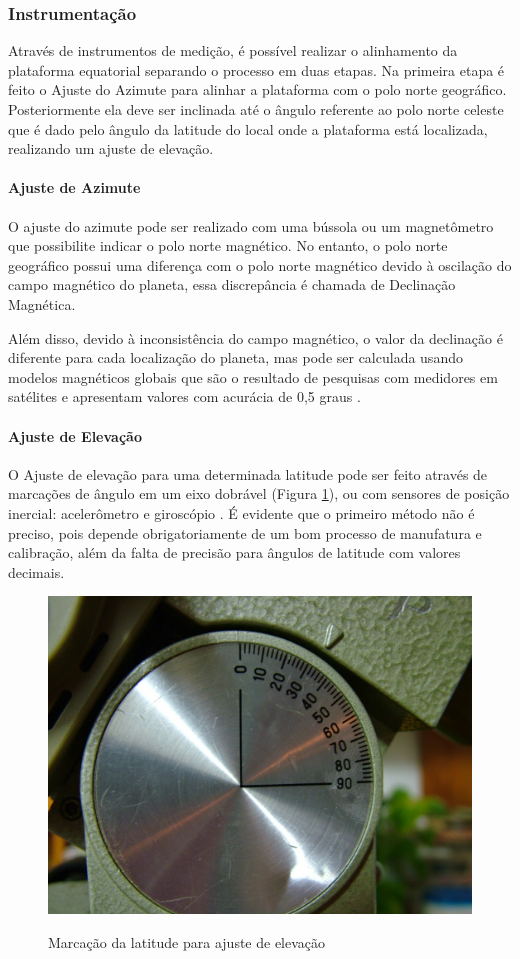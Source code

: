\subsubsection{Instrumentação}

Através de instrumentos de medição, é possível realizar o alinhamento da plataforma equatorial separando o processo em duas etapas. Na primeira etapa é feito o Ajuste do Azimute para alinhar a plataforma com o polo norte geográfico. Posteriormente ela deve ser inclinada até o ângulo referente ao polo norte celeste que é dado pelo ângulo da latitude do local onde a plataforma está localizada, realizando um ajuste de elevação. 

\paragraph{Ajuste de Azimute}
O ajuste do azimute pode ser realizado com uma bússola ou um magnetômetro que possibilite indicar o polo norte magnético. No entanto, o polo norte geográfico possui uma diferença com o polo norte magnético devido à oscilação do campo magnético do planeta, essa discrepância é chamada de Declinação Magnética. 

Além disso, devido à inconsistência do campo magnético, o valor da declinação é diferente para cada localização do planeta, mas pode ser calculada usando modelos magnéticos globais que são o resultado de pesquisas com medidores em satélites e apresentam valores com acurácia de 0,5 graus \cite{site:noicDecMag}.

\paragraph{Ajuste de Elevação}
O Ajuste de elevação para uma determinada latitude pode ser feito através de marcações de ângulo em um eixo dobrável (Figura \ref{fig:marcacao_latitude}), ou com sensores de posição inercial: acelerômetro e giroscópio \cite{site:driftLupus}. É evidente que o primeiro método não é preciso, pois depende obrigatoriamente de um bom processo de manufatura e calibração, além da falta de precisão para ângulos de latitude com valores decimais. 

\begin{figure}[!htb]
	\centering
	\caption{Marcação da latitude para ajuste de elevação}
	\includegraphics[width=0.45\linewidth]{figuras/marcacao_latitude}
	\label{fig:marcacao_latitude}
\end{figure}

